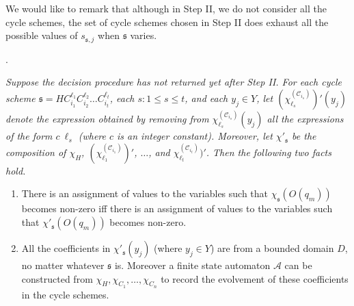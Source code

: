 \documentclass[runningheads,a4paper]{llncs}
\def\Aa{{\mathcal{A} }}
\def\Cc{{\mathcal{C} }}
\def\schm{{\mathfrak{s} }}
\begin{document}
We would like to remark that although in Step II, we do not consider all the cycle schemes, the set of cycle schemes chosen in Step II does exhaust all the possible values of $s_{\schm,j}$ when $\schm$ varies.


\medskip

. 
{\it 
Suppose the decision procedure has not returned yet after Step II. For each cycle scheme $\schm=HC_{i_1}^{\ell_1} C_{i_2}^{\ell_2} \dots C_{i_t}^{\ell_t}$, each $s: 1 \le s \le t$, and each $y_j \in Y$, let $(\chi^{(\Cc_{i_s})}_{\ell_s})'(y_j)$ denote the expression obtained by removing from $\chi^{(\Cc_{i_s})}_{\ell_s}(y_j)$  all the expressions of the form $c\ \ell_s$ (where $c$ is an integer constant).  Moreover, let $\chi'_\schm$ be the composition of $\chi_H$, $(\chi^{(\Cc_{i_1})}_{\ell_1})'$, $\dots$, and $\chi^{(\Cc_{i_t})}_{\ell_t})'$. Then the following two facts hold.
\begin{enumerate}
\item There is an assignment of values to the variables such that $\chi_\schm(O(q_m))$ becomes non-zero iff there is an assignment of values to the variables such that $\chi'_\schm(O(q_m))$ becomes non-zero.
%
\item All the coefficients in $\chi'_\schm(y_j)$ (where $y_j \in Y$) are from a bounded domain $D$, no matter whatever $\schm$ is. Moreover a finite state automaton $\Aa$ can be constructed from $\chi_H,\chi_{C_1},\dots,\chi_{C_n}$ to record the evolvement of these coefficients  in the cycle schemes.
\end{enumerate}
}
\end{document}
